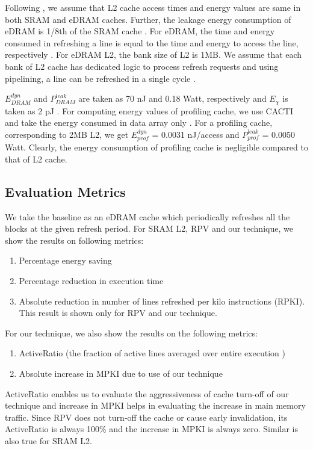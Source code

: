 Following \cite{agrawalrefrint}, we assume that L2 cache access times and energy 
values are same in both SRAM and eDRAM caches. Further, the leakage energy 
consumption of eDRAM is 1/8th of the SRAM cache 
\cite{iyer2005embedded,agrawalrefrint}. For eDRAM, the time and energy consumed 
in refreshing a line is equal to the time and energy to access the line, 
respectively \cite{agrawalrefrint}. For eDRAM L2, the bank size of L2 is 1MB. We 
assume that each bank of L2 cache  has dedicated logic to process refresh 
requests and using pipelining, a line can be refreshed in a single cycle 
\cite{agrawalrefrint}. 

$ E^{dyn}_{DRAM}$  and $P^{leak}_{DRAM}$ are taken as 70 nJ and 0.18 Watt, 
respectively \cite{mittal2013PhDThesis} and $E_{\chi}$ is taken 
as 2 pJ \cite{mittal2013PhDThesis}. For computing energy values of profiling 
cache, we use CACTI and take the energy consumed in data array only 
\cite{mittal2013PhDThesis}. For a profiling cache, corresponding to 2MB L2, we 
get $E^{dyn}_{prof}$ = 0.0031 nJ/access and  $ P^{leak}_{prof}$ = 0.0050 Watt. 
Clearly, the energy consumption of profiling cache is negligible compared to 
that of L2 cache. 


\subsection{Evaluation Metrics}
We take the baseline as an eDRAM cache which periodically refreshes all the 
blocks at the given refresh period. For SRAM L2, RPV and our technique, we show 
the results on following metrics:
\begin{enumerate}
\item Percentage energy saving
\item  Percentage  reduction in execution time
\item Absolute reduction in number of lines refreshed per kilo instructions 
(RPKI). This result is shown only for RPV and our technique.  
\end{enumerate}
For our technique, we also show the results on the following metrics:
\begin{enumerate}
\item ActiveRatio (the fraction of active lines averaged over entire execution 
\cite{mittal2013PhDThesis}) 
\item Absolute increase in MPKI due to use of our technique
\end{enumerate}

 ActiveRatio enables us to evaluate the aggressiveness of cache turn-off of our technique and increase in MPKI helps in evaluating the increase in main memory traffic. Since RPV does not turn-off the cache or cause early invalidation, its ActiveRatio is always 100\% and the increase in MPKI is always zero. Similar is also true for SRAM L2. 
 

